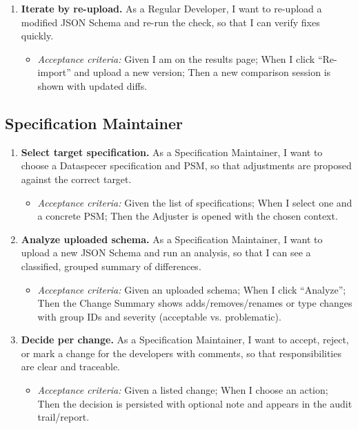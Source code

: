 \begin{enumerate}
  \item \textbf{Iterate by re-upload.} As a Regular Developer, I want to re-upload a modified JSON Schema and re-run the check, so that I can verify fixes quickly.
  \begin{itemize}
    \item \emph{Acceptance criteria:} Given I am on the results page; When I click “Re-import” and upload a new version; Then a new comparison session is shown with updated diffs.
  \end{itemize}
\end{enumerate}

\subsection*{Specification Maintainer}
\begin{enumerate}
  \item \textbf{Select target specification.} As a Specification Maintainer, I want to choose a Dataspecer specification and PSM, so that adjustments are proposed against the correct target. 
  \begin{itemize}
    \item \emph{Acceptance criteria:} Given the list of specifications; When I select one and a concrete PSM; Then the Adjuster is opened with the chosen context.
  \end{itemize}

  \item \textbf{Analyze uploaded schema.} As a Specification Maintainer, I want to upload a new JSON Schema and run an analysis, so that I can see a classified, grouped summary of differences.
  \begin{itemize}
    \item \emph{Acceptance criteria:} Given an uploaded schema; When I click “Analyze”; Then the Change Summary shows adds/removes/renames or type changes with group IDs and severity (acceptable vs. problematic).
  \end{itemize}

  \item \textbf{Decide per change.} As a Specification Maintainer, I want to accept, reject, or mark a change for the developers with comments, so that responsibilities are clear and traceable. 
  \begin{itemize}
    \item \emph{Acceptance criteria:} Given a listed change; When I choose an action; Then the decision is persisted with optional note and appears in the audit trail/report.
  \end{itemize}


\end{enumerate}
